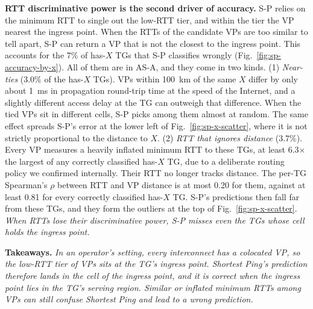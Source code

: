 \noindent \textbf{RTT discriminative power is the second driver of accuracy.} S-P relies on the minimum RTT to single out the low-RTT tier, and within the tier the VP nearest the ingress point. When the RTTs of the candidate VPs are too similar to tell apart, S-P can return a VP that is not the closest to the ingress point. This accounts for the 7\% of has-$X$ TGs that S-P classifies wrongly (Fig.~\ref{fig:sp-accuracy-by-x}). All of them are in AS-A, and they come in two kinds. (1) \emph{Near-ties} (3.0\% of the has-$X$ TGs). VPs within 100~km of the same $X$ differ by only about 1~ms in propagation round-trip time at the speed of the Internet, and a slightly different access delay at the TG can outweigh that difference. When the tied VPs sit in different cells, S-P picks among them almost at random. The same effect spreads S-P's error at the lower left of Fig.~\ref{fig:sp-x-scatter}, where it is not strictly proportional to the distance to $X$. (2) \emph{RTT that ignores distance} (3.7\%). Every VP measures a heavily inflated minimum RTT to these TGs, at least 6.3$\times$ the largest of any correctly classified has-$X$ TG, due to a deliberate routing policy we confirmed internally. Their RTT no longer tracks distance. The per-TG Spearman's $\rho$ between RTT and VP distance is at most 0.20 for them, against at least 0.81 for every correctly classified has-$X$ TG. S-P's predictions then fall far from these TGs, and they form the outliers at the top of Fig.~\ref{fig:sp-x-scatter}. \emph{When RTTs lose their discriminative power, S-P misses even the TGs whose cell holds the ingress point.}

\noindent \textbf{Takeaways.} \textit{In an operator's setting, every interconnect has a colocated VP, so the low-RTT tier of VPs sits at the TG's ingress point. Shortest Ping's prediction therefore lands in the cell of the ingress point, and it is correct when the ingress point lies in the TG's serving region. Similar or inflated minimum RTTs among VPs can still confuse Shortest Ping and lead to a wrong prediction.}
